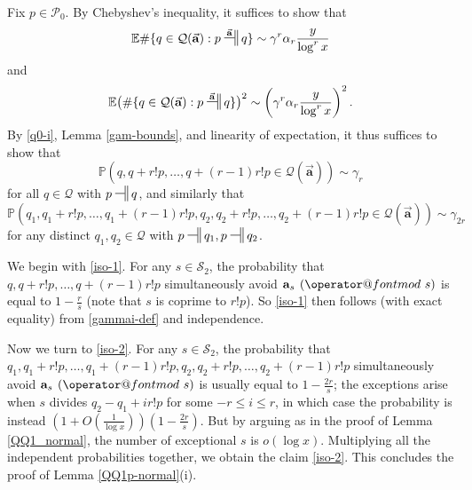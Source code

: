 \documentclass[11pt]{amsart}
\makeatletter
\numberwithin{equation}{section}  %
\theoremstyle{remark}
\theoremstyle{plain}
\numberwithin{equation}{section}
\newcommand{\E}{\mathbb{E}}  %
\newcommand{\PR}{\mathbb{P}}  %
\renewcommand{\pmod}[1]{\allowbreak\mkern7mu({\operator@font mod}\,\,#1)}
\renewcommand{\leq}{\leqslant}
\renewcommand{\(}{\left(}
\renewcommand{\)}{\right)}
\newcommand{\asym}{\sim}   %
\newcommand{\relr}{\nsdtstile{}{}} %
\newcommand{\relra}{\nsdtstile{}{\vect{\mathbf{a}}}} %
\newcommand{\vect}[1]{{\ensuremath{\vec{#1}}}}
\newcommand{\PP}{\mathcal{P}}
\newcommand{\QQ}{\mathcal{Q}}
\newcommand{\cS}{\mathcal{S}}
\makeatother
\begin{document}
Fix $p \in \PP_0$. By Chebyshev's inequality, it suffices to show that
\begin{equation*}
 \E \# \{ q \in \QQ(\vect{\mathbf{a}}): p \relra q \} \asym \gamma^r \alpha_r \frac{y}{\log^r x}
\end{equation*}
and
\begin{equation*}
 \E \big(\# \{ q \in \QQ(\vect{\mathbf{a}}): p \relra q \}\big)^2 \asym \left(\gamma^{r} \alpha_r \frac{y}{\log^r x}\right)^2.
\end{equation*} 
By \eqref{q0-i}, Lemma \ref{gam-bounds}, and linearity of expectation, it thus suffices to show that
\begin{equation}\label{iso-1}
\PR( q, q+r!p, \dots, q+(r-1)r!p \in \QQ(\vect{\mathbf{a}}) ) \asym \gamma_r
\end{equation}
for all $q \in \QQ$ with $p \relr q$, and similarly that
\begin{equation}\label{iso-2}
\PR( q_1, q_1+r!p, \dots, q_1+(r-1)r!p,q_2,q_2+r!p,\dots,q_2+(r-1)r!p \in \QQ(\vect{\mathbf{a}}) ) \asym \gamma_{2r}
\end{equation}
for any distinct $q_1,q_2 \in \QQ$ with $p \relr q_1,p \relr q_2$.

We begin with \eqref{iso-1}.  For any $s \in \cS_2$, the probability that $q,q+r!p,\dots,q+(r-1)r!p$ simultaneously avoid $\mathbf{a}_s \pmod{s}$ is equal to $1 - \frac{r}{s}$ (note that $s$ is coprime to $r!p$).  So \eqref{iso-1} then follows (with exact equality) from \eqref{gammai-def} and independence.

Now we turn to \eqref{iso-2}.  For any $s \in \cS_2$, the probability
that $q_1, q_1+r!p, \dots,
q_1+(r-1)r!p,q_2,q_2+r!p,\dots,q_2+(r-1)r!p$ simultaneously avoid
$\mathbf{a}_s \pmod{s}$ is usually equal to $1-\frac{2r}{s}$; the
exceptions arise when $s$ divides $q_2-q_1 + i r! p$ for some $-r \leq
i \leq r$, in which case the probability is instead $(1 +
O(\frac{1}{\log x})) (1-\frac{2r}{s})$.  But by arguing as in the
proof of Lemma \ref{QQ1_normal}, the number of exceptional $s$ is
$o(\log x)$.  Multiplying all the independent probabilities together,
we obtain the claim \eqref{iso-2}.  This concludes the proof of Lemma \ref{QQ1p-normal}(i).
\end{document}
